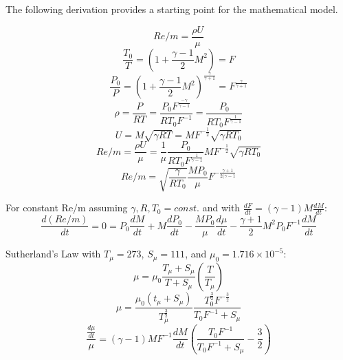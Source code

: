The following derivation provides a starting point for the mathematical model.

\begin{equation}
    Re/m = \frac{\rho U}{\mu}
\end{equation}
\begin{equation}
    \frac{T_0}{T} = (1+\frac{\gamma-1}{2}M^2) = F
\end{equation}
\begin{equation}
    \frac{P_0}{P} = (1+\frac{\gamma-1}{2}M^2)^{\frac{\gamma}{\gamma+1}} = F^{\frac{\gamma}{\gamma+1}}
\end{equation}
\begin{equation}
    \rho = \frac{P}{R T} = \frac{P_0 F^{\frac{-\gamma}{\gamma-1}}}{R T_0 F^{-1}} = \frac{P_0}{R T_0 F^{\frac{1}{\gamma-1}}}
\end{equation}
\begin{equation}
    U = M \sqrt{\gamma R T} = M F^{-\frac{1}{2}} \sqrt{\gamma R T_0}
\end{equation}
\begin{equation*}
    Re/m = \frac{\rho U}{\mu} = \frac{1}{\mu} \frac{P_0}{R T_0 F^{\frac{1}{\gamma-1}}} M F^{-\frac{1}{2}} \sqrt{\gamma R T_0}
\end{equation*}
\begin{equation}
    Re/m = \sqrt{\frac{\gamma}{R T_0}} \frac{M P_0}{\mu} F^{-\frac{\gamma+1}{2(\gamma -1}}
\end{equation}

For constant Re/m assuming $\gamma, R, T_0 = const.$ and with $\frac{dF}{dt} = (\gamma-1)M \frac{dM}{dt}$:
\begin{equation}
    \frac{d(Re/m)}{dt} = 0 = P_0 \frac{dM}{dt} + M \frac{dP_0}{dt} - \frac{M P_0}{\mu} \frac{d\mu}{dt} - \frac{\gamma+1}{2} M^2 P_0 F^{-1} \frac{dM}{dt}
\end{equation}

Sutherland's Law with $T_\mu = 273$, $S_\mu = 111$, and $\mu_0 = 1.716 \times 10^{-5}$:
\begin{equation}
    \mu = \mu_0 \frac{T_\mu+S_\mu}{T+S_\mu} \left( \frac{T}{T_\mu} \right)
\end{equation}
\begin{equation}
    \mu = \frac{\mu_0(t_\mu+S_\mu)}{T_\mu^{\frac{3}{2}}} \frac{T_0^{\frac{3}{2}} F^{-\frac{3}{2}}}{T_0 F^{-1}+S_\mu}
\end{equation}
\begin{equation}
    \frac{\frac{d\mu}{dt}}{\mu} = (\gamma-1) M F^{-1} \frac{dM}{dt} \left( \frac{T_0 F^{-1}}{T_0 F^{-1} + S_\mu}-\frac{3}{2} \right)
\end{equation}

